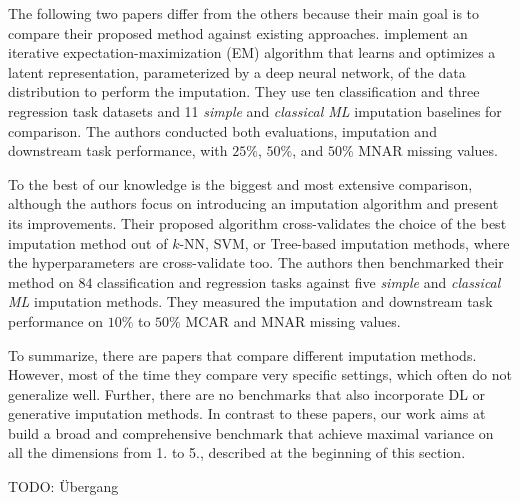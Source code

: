 The following two papers differ from the others because their main goal is to compare their proposed method against existing approaches. \cite{Imputation_Benchmark_6} implement an iterative expectation-maximization (EM) algorithm that learns and optimizes a latent representation, parameterized by a deep neural network, of the data distribution to perform the imputation. They use ten classification and three regression task datasets and 11 \emph{simple} and \emph{classical ML} imputation baselines for comparison. The authors conducted both evaluations, imputation and downstream task performance, with $25\%$, $50\%$, and $50\%$ MNAR missing values.

To the best of our knowledge \citep{Imputation_Benchmark_4} is the biggest and most extensive comparison, although the authors focus on introducing an imputation algorithm and present its improvements. Their proposed algorithm cross-validates the choice of the best imputation method out of $k$-NN, SVM, or Tree-based imputation methods, where the hyperparameters are cross-validate too. The authors then benchmarked their method on $84$ classification and regression tasks against five \emph{simple} and \emph{classical ML} imputation methods. They measured the imputation and downstream task performance on $10\%$ to $50\%$ MCAR and MNAR missing values.

To summarize, there are papers that compare different imputation methods. However, most of the time they compare very specific settings, which often do not generalize well. Further, there are no benchmarks that also incorporate DL or generative imputation methods. In contrast to these papers, our work aims at build a broad and comprehensive benchmark that achieve maximal variance on all the dimensions from 1. to 5., described at the beginning of this section.


TODO: Übergang
